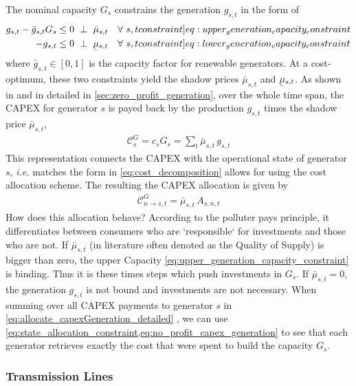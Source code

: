 \documentclass[11pt,twocolumn]{article}
\newcommand{\ie}{\textit{i.e.} }
\newcommand{\ubar}[1]{\underaccent{\bar}{#1}}
\newcommand{\resultsin}[1]{\hspace{6pt} \bot  \hspace{6pt} #1}
\newcommand{\Forall}[1]{\hspace{10pt} \forall \,\, #1 }
\newcommand{\generation}{g_{s,t}}
\newcommand{\generationpotential}{\bar{g}_{s,t}}
\newcommand{\capacitygeneration}{G_{s}}
\newcommand{\capitalpricegeneration}{c_{s}}
\newcommand{\mulowergeneration}{\ubar{\mu}_{s,t}}
\newcommand{\muuppergeneration}{\bar{\mu}_{s,t}}
\newcommand{\allocategeneration}[1][s, n]{A_{#1,t}}
\newcommand{\allocatecapexgeneration}[1][n \rightarrow s]{\mathcal{C}^{G}_{#1,t}}
\newcommand{\capexgeneration}{\mathcal{C}^G}
\begin{document}
The nominal capacity $\capacitygeneration$ constrains the generation $\generation$ in the form of 
\begin{align}
\generation - \generationpotential \capacitygeneration  &\le 0 \resultsin{\muuppergeneration} \Forall{s,t} 
\label[constraint]{eq:upper_generation_capacity_constraint}\\ 
- \generation &\le 0 \resultsin{\mulowergeneration} \Forall{s,t} 
\label[constraint]{eq:lower_generation_capacity_constraint}
\end{align}
where $\generationpotential \in \left[ 0,1\right]$ is the capacity factor for renewable generators. At a cost-optimum, these two constraints yield the shadow prices $\muuppergeneration$ and $\mulowergeneration$.  As shown in \cite{brown_decreasing_2020} and in detailed in \cref{sec:zero_profit_generation}, over the whole time span, the CAPEX for generator $s$ is payed back by the production $\generation$ times the shadow price $\muuppergeneration$, 
\begin{align}
 \capexgeneration_s = \capitalpricegeneration \capacitygeneration = \sum_t \muuppergeneration \,  \generation 
 \label{eq:no_profit_capex_generation}
\end{align}
This representation connects the CAPEX with the operational state of generator $s$, \ie matches the form in \cref{eq:cost_decomposition} allows for using the cost allocation scheme. The resulting the CAPEX allocation is given by
\begin{align}
 \allocatecapexgeneration = \muuppergeneration \, \allocategeneration
 \label{eq:allocate_capexGeneration_detailed}
\end{align}
How does this allocation behave? According to the polluter pays principle, it differentiates between consumers who are `responsible` for investments and those who are not. If $\muuppergeneration$ (in literature often denoted as the Quality of Supply) is bigger than zero, the upper Capacity \cref{eq:upper_generation_capacity_constraint} is binding. Thus it is these times steps which push investments in $\capacitygeneration$. If $\muuppergeneration = 0$, the generation $\generation$ is not bound and investments are not necessary. 
When summing over all CAPEX payments to generator $s$ in \cref{eq:allocate_capexGeneration_detailed} , we can use \cref{eq:state_allocation_constraint,eq:no_profit_capex_generation} to see that each generator retrieves exactly the cost that were spent to build the capacity $\capacitygeneration$.
 

\subsubsection{Transmission Lines}
\end{document}
